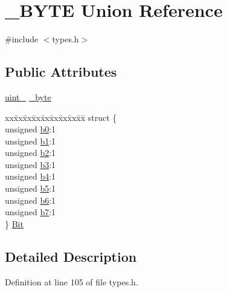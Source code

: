 \hypertarget{union___b_y_t_e}{}\section{\+\_\+\+B\+Y\+TE Union Reference}
\label{union___b_y_t_e}


{\ttfamily \#include $<$types.\+h$>$}

\subsection*{Public Attributes}
\begin{DoxyCompactItemize}
\item 
\hyperlink{types_8h_ad3209046c23f739a81581c10a4be7d92}{uint\+\_} \hyperlink{union___b_y_t_e_afcc1405a7fdc66607fe6ae4ef18b6d69}{\+\_\+byte}
\item 
\begin{tabbing}
xx\=xx\=xx\=xx\=xx\=xx\=xx\=xx\=xx\=\kill
struct \{\\
\>unsigned \hyperlink{union___b_y_t_e_a6fb1aa085edab05123056d1a96a2211e}{b0}:1\\
\>unsigned \hyperlink{union___b_y_t_e_a809339279845dab2c5d170e5ce120afc}{b1}:1\\
\>unsigned \hyperlink{union___b_y_t_e_a4e08cbe05b806be7f2e73120fb78d926}{b2}:1\\
\>unsigned \hyperlink{union___b_y_t_e_a2a6397723a423e94b0b2115fcbd8602b}{b3}:1\\
\>unsigned \hyperlink{union___b_y_t_e_a9f7be60ef7715bb8d228596b776a9878}{b4}:1\\
\>unsigned \hyperlink{union___b_y_t_e_aac0c6f560365fe81cf06fb3e6ce4e043}{b5}:1\\
\>unsigned \hyperlink{union___b_y_t_e_a134880ab6d39747298c0813b024f62b2}{b6}:1\\
\>unsigned \hyperlink{union___b_y_t_e_a4663fb292155715dddddb77458687c4b}{b7}:1\\
\} \hyperlink{union___b_y_t_e_a686e27e1bff57d6aed0a5029d828df7d}{Bit}\\

\end{tabbing}\end{DoxyCompactItemize}


\subsection{Detailed Description}


Definition at line 105 of file types.\+h.



